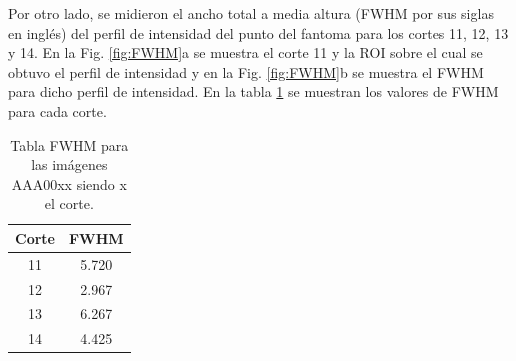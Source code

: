 \documentclass[letterpaper,12pt]{article}
\theoremstyle{plain}
\begin{document}
Por otro lado, se midieron el ancho total a media altura (FWHM por sus siglas en inglés) del perfil de intensidad del punto del fantoma para los cortes 11, 12, 13 y 14. En la Fig. \ref{fig:FWHM}a se muestra el corte 11 y la ROI sobre el cual se obtuvo el perfil de intensidad y en la Fig. \ref{fig:FWHM}b se muestra el FWHM para dicho perfil de intensidad. En la tabla \ref{tab:FWHM} se muestran los valores de FWHM para cada corte.

\begin{table}[h]
    \centering
    \begin{tabular}{c||c}
    \hline
    Corte & FWHM  \\ \hline
    11    & 5.720   \\ \hline
    12    & 2.967   \\ \hline
    13    & 6.267   \\ \hline
    14    & 4.425   \\ \hline
    \end{tabular}
    \caption{Tabla FWHM para las imágenes AAA00xx siendo x el corte.} 
    \label{tab:FWHM}
\end{table}
\end{document}
